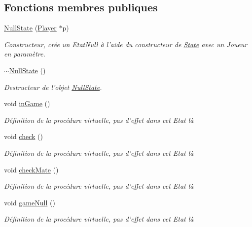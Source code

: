 \subsection*{Fonctions membres publiques}
\begin{DoxyCompactItemize}
\item 
\hyperlink{class_null_state_a16b8bc7f006616e9c057ddf2b1ec811d}{Null\-State} (\hyperlink{class_player}{Player} $\ast$p)
\begin{DoxyCompactList}\small\item\em Constructeur, crée un Etat\-Null à l'aide du constructeur de \hyperlink{class_state}{State} avec un Joueur en paramètre. \end{DoxyCompactList}\item 
\hyperlink{class_null_state_a3d286ab0ced8da71c8729871d1bd3aae}{$\sim$\-Null\-State} ()
\begin{DoxyCompactList}\small\item\em Destructeur de l'objet \hyperlink{class_null_state}{Null\-State}. \end{DoxyCompactList}\item 
void \hyperlink{class_null_state_a3c51a85d1d0273b7f7db4ed20672c68c}{in\-Game} ()
\begin{DoxyCompactList}\small\item\em Définition de la procédure virtuelle, pas d'effet dans cet Etat là \end{DoxyCompactList}\item 
void \hyperlink{class_null_state_a04825452cd1018dec2525609a3079aff}{check} ()
\begin{DoxyCompactList}\small\item\em Définition de la procédure virtuelle, pas d'effet dans cet Etat là \end{DoxyCompactList}\item 
void \hyperlink{class_null_state_a2bc6da41f64658fb9f733f6b23f0e499}{check\-Mate} ()
\begin{DoxyCompactList}\small\item\em Définition de la procédure virtuelle, pas d'effet dans cet Etat là \end{DoxyCompactList}\item 
void \hyperlink{class_null_state_a9a735f7e4cbf7c3439208f9bb90b649d}{game\-Null} ()
\begin{DoxyCompactList}\small\item\em Définition de la procédure virtuelle, pas d'effet dans cet Etat là \end{DoxyCompactList}\item 

\end{DoxyCompactItemize}
